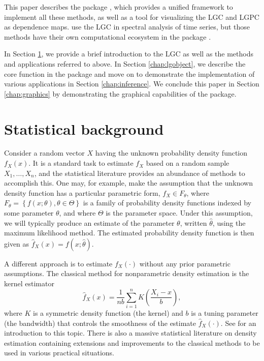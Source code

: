 This paper describes the  package \citep{otne:2019}, which provides a unified framework to implement all these methods, as well as a tool for visualizing the LGC and LGPC as dependence maps. \citet{jord:tjos:2017} use the LGC in spectral analysis of time series, but those methods have their own computational ecosystem in the  package \citep{jord:2018}.

In Section \ref{chap:background}, we provide a brief introduction to the LGC as well as the methods and applications referred to above. In Section \ref{chap:lgobject}, we describe the core function in the  package and move on to demonstrate the implementation of various applications in Section \ref{chap:inference}. We conclude this paper in Section \ref{chap:graphics} by demonstrating the graphical capabilities of the  package.

\section{Statistical background} 
\label{chap:background}

Consider a random vector $X$ having the unknown probability density function $f_X\left(x\right)$. It is a standard task to estimate $f_X$ based on a random sample $X_1,\ldots, X_n$, and the statistical literature provides an abundance of methods to accomplish this. One may, for example, make the assumption that the unknown density function has a particular parametric form, $f_X \in F_{\theta}$, where $F_{\theta} = \left\{f(x;\theta), \theta \in \Theta\right\}$ is a family of probability density functions indexed by some parameter $\theta$, and where $\Theta$ is the parameter space. Under this assumption, we will typically produce an estimate of the parameter $\theta$, written $\widehat \theta$, using the maximum likelihood method. The estimated probability density function is then given as $\widehat f_X\left(x\right) = f\left(x; \widehat\theta\right)$.

A different approach is to estimate $f_X\left(\cdot\right)$ without any prior parametric assumptions. The classical method for nonparametric density estimation is the kernel estimator 
$$\widehat f_X\left(x\right) = \frac{1}{nb}\sum_{i=1}^n K\left(\frac{X_i - x}{b}\right),$$
where $K$ is a symmetric density function (the kernel) and $b$ is a tuning parameter (the bandwidth) that controls the smoothness of the estimate $\widehat f_X\left(\cdot\right)$. See \citet{silv:1986} for an introduction to this topic. There is also a massive statistical literature on density estimation containing extensions and improvements to the classical methods to be used in various practical situations. 

